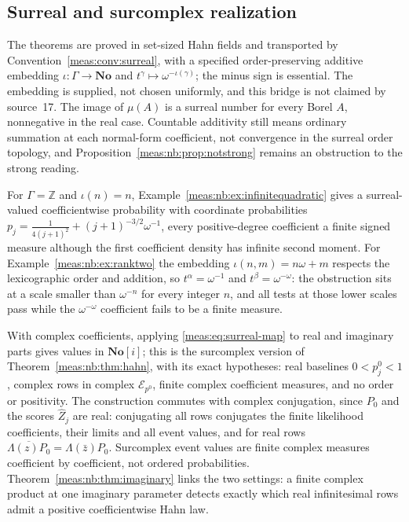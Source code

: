 \documentclass[11pt]{article}
\numberwithin{equation}{section}
\theoremstyle{definition}
\theoremstyle{remark}
\newcommand{\Z}{\mathbb Z}
\newcommand{\No}{\mathbf{No}}
\newcommand{\Zh}{\widehat Z}
\newcommand{\Erow}{\mathcal E_{p^0}}
\begin{document}
\subsection{Surreal and surcomplex realization}\label{meas:nb:sub:surreal}

The theorems are proved in set-sized Hahn fields and transported by
Convention~\ref{meas:conv:surreal}, with a specified order-preserving additive
embedding $\iota:\Gamma\to\No$ and $t^\gamma\mapsto\omega^{-\iota(\gamma)}$; the minus sign is
essential. The embedding is supplied, not chosen uniformly, and this bridge is not
claimed by source~17. The image of $\mu(A)$ is a surreal number for every Borel $A$,
nonnegative in the real case. Countable additivity still means ordinary summation
at each normal-form coefficient, not convergence in the surreal order topology, and
Proposition~\ref{meas:nb:prop:notstrong} remains an obstruction to the strong
reading.

For $\Gamma=\Z$ and $\iota(n)=n$, Example~\ref{meas:nb:ex:infinitequadratic} gives a
surreal-valued coefficientwise probability with coordinate probabilities
$p_j=\frac1{4(j+1)^2}+(j+1)^{-3/2}\omega^{-1}$, every positive-degree coefficient a
finite signed measure although the first coefficient density has infinite second
moment. For Example~\ref{meas:nb:ex:ranktwo} the embedding $\iota(n,m)=n\omega+m$
respects the lexicographic order and addition, so $t^\alpha=\omega^{-1}$ and
$t^\beta=\omega^{-\omega}$: the obstruction sits at a scale smaller than $\omega^{-n}$ for
every integer $n$, and all tests at those lower scales pass while the
$\omega^{-\omega}$ coefficient fails to be a finite measure.

With complex coefficients, applying \eqref{meas:eq:surreal-map} to real and imaginary
parts gives values in $\No[i]$; this is the surcomplex version of
Theorem~\ref{meas:nb:thm:hahn}, with its exact hypotheses: real baselines $0<p_j^0<1$,
complex rows in complex $\Erow$, finite complex coefficient measures, and no order
or positivity. The construction commutes with complex conjugation, since $P_0$ and
the scores $\Zh_j$ are real: conjugating all rows conjugates the finite likelihood
coefficients, their limits and all event values, and for real rows
$\overline{\Lambda(z)P_0}=\Lambda(\bar z)P_0$. Surcomplex event values are finite complex
measures coefficient by coefficient, not ordered probabilities.
Theorem~\ref{meas:nb:thm:imaginary} links the two settings: a finite complex product
at one imaginary parameter detects exactly which real infinitesimal rows admit a
positive coefficientwise Hahn law.
\end{document}
